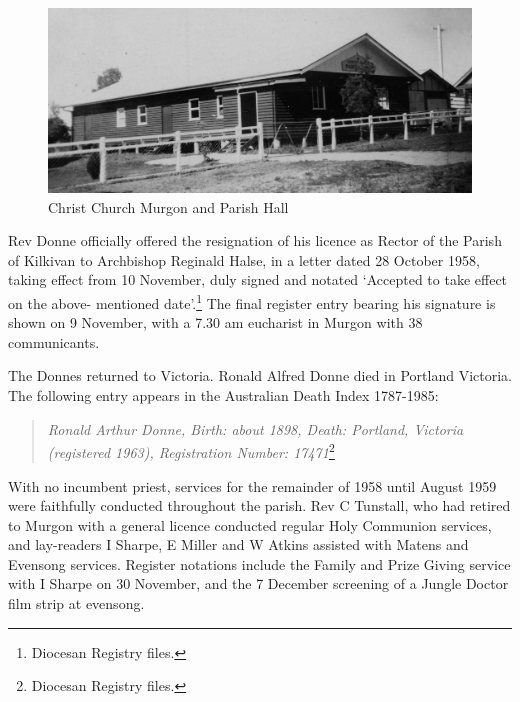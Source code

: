 \begin{figure}[!htb]
\begin{center}
\includegraphics[width=1.\textwidth,center]{../images/churchHallEarly.jpg}
\caption{Christ Church Murgon and Parish Hall}
\end{center}
\end{figure}




Rev Donne officially offered the resignation of his licence as Rector of the Parish of Kilkivan to Archbishop Reginald Halse, in a letter dated 28 October 1958, taking effect from 10 November, duly signed and notated `Accepted to take effect on the above- mentioned date'.\footnote{Diocesan Registry files.} The final register entry bearing his signature is shown on 9 November, with a 7.30 am eucharist in Murgon with 38 communicants.


The Donnes returned to Victoria. Ronald Alfred Donne died in Portland Victoria. The following entry appears in the Australian Death Index 1787-1985:



\begin{quote}

\emph{Ronald Arthur Donne, Birth: about 1898, Death: Portland, Victoria (registered 1963), Registration Number: 17471}\footnote{Diocesan Registry files.}
\end{quote}



With no incumbent priest, services for the remainder of 1958 until August 1959 were faithfully conducted throughout the parish. Rev C Tunstall, who had retired to Murgon with a general licence conducted regular Holy Communion services, and lay-readers I Sharpe, E Miller and W Atkins assisted with Matens and Evensong services. Register notations include the Family and Prize Giving service with I Sharpe on 30 November, and the 7 December screening of a Jungle Doctor film strip at evensong.



